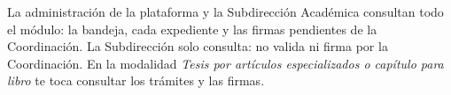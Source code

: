 \documentclass[11pt,a4paper]{article}
\begin{document}
{\small\tableofcontents}
\newpage
\begin{quevasahacer}
La administración de la plataforma y la Subdirección Académica consultan todo el módulo: la bandeja, cada expediente y las firmas pendientes de la Coordinación. La Subdirección solo consulta: no valida ni firma por la Coordinación. En la modalidad \emph{Tesis por artículos especializados o capítulo para libro} te toca consultar los trámites y las firmas.
\end{quevasahacer}




\end{document}
